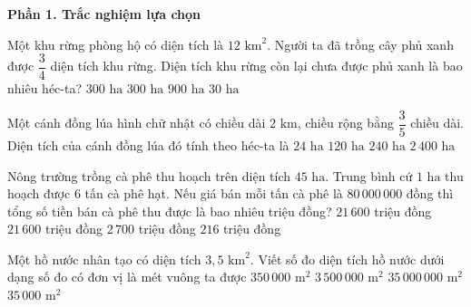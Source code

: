 \textbf{Phần 1. Trắc nghiệm lựa chọn}

\begin{ex} %
Một khu rừng phòng hộ có diện tích là $12\text{ km}^2$. Người ta đã trồng cây phủ xanh được $\dfrac{3}{4}$ diện tích khu rừng. Diện tích khu rừng còn lại chưa được phủ xanh là bao nhiêu héc-ta?
\choice
{$300\text{ ha}$}
{\True $300\text{ ha}$}
{$900\text{ ha}$}
{$30\text{ ha}$}
\end{ex}

\begin{ex} %
Một cánh đồng lúa hình chữ nhật có chiều dài $2\text{ km}$, chiều rộng bằng $\dfrac{3}{5}$ chiều dài. Diện tích của cánh đồng lúa đó tính theo héc-ta là
\choice
{$24\text{ ha}$}
{$120\text{ ha}$}
{\True $240\text{ ha}$}
{$2\,400\text{ ha}$}
\end{ex}

\begin{ex} %
Nông trường trồng cà phê thu hoạch trên diện tích $45\text{ ha}$. Trung bình cứ $1\text{ ha}$ thu hoạch được $6$ tấn cà phê hạt. Nếu giá bán mỗi tấn cà phê là $80\,000\,000$ đồng thì tổng số tiền bán cà phê thu được là bao nhiêu triệu đồng?
\choice
{$21\,600$ triệu đồng}
{\True $21\,600$ triệu đồng}
{$2\,700$ triệu đồng}
{$216$ triệu đồng}
\end{ex}

\begin{ex} %
Một hồ nước nhân tạo có diện tích $3{,}5\text{ km}^2$. Viết số đo diện tích hồ nước dưới dạng số đo có đơn vị là mét vuông ta được
\choice
{$350\,000\text{ m}^2$}
{\True $3\,500\,000\text{ m}^2$}
{$35\,000\,000\text{ m}^2$}
{$35\,000\text{ m}^2$}
\end{ex}

